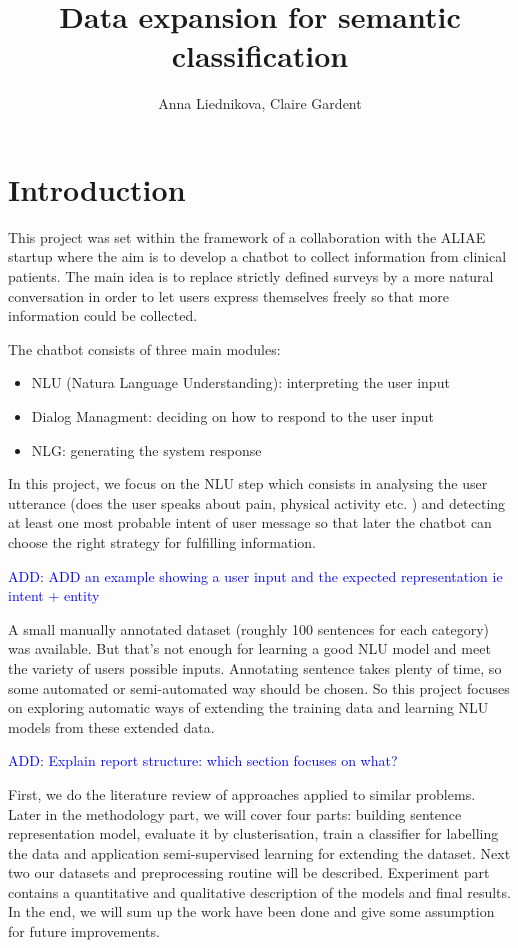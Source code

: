 \documentclass[11pt]{article}
\title{Data expansion for semantic classification}
\author{Anna Liednikova, Claire Gardent}
\newcommand\add[1]{{\textcolor{blue}{ADD: #1}}}
\begin{document}
\maketitle

\tableofcontents

\clearpage

\section{Introduction}

 
This project was set within the framework of a collaboration with the
ALIAE startup where the aim is to develop a chatbot to collect
information from clinical patients. The main idea is to replace
strictly defined surveys by a more natural conversation in order to
let users express themselves freely so that more information could be
collected.

The chatbot consists of three main modules: 
\begin{itemize}
\item NLU (Natura Language Understanding): interpreting the user input
\item Dialog Managment: deciding on how to respond to the user input
\item NLG: generating the system response
\end{itemize}

In this project, we focus on the NLU step which consists in
analysing the user utterance (does the user speaks about pain,
physical activity etc. ) and detecting at least one most probable
intent of user message so that later the chatbot can choose the right
strategy for fulfilling information.

\add{ADD an example showing a user input and the expected representation ie intent + entity}

A small manually annotated dataset (roughly 100 sentences for each category) was available. But that's not enough for learning a good NLU model and meet the variety of users possible inputs. Annotating sentence takes plenty of time, so some automated or semi-automated way should be chosen. So this project focuses on exploring automatic ways of extending the training data and learning NLU models from these extended data.

\add{Explain report structure: which section focuses on what?}

First, we do the literature review of approaches applied to similar problems. Later in the methodology part, we will cover four parts: building sentence representation model, evaluate it by clusterisation, train a classifier for labelling the data and application semi-supervised learning for extending the dataset. Next two our datasets and preprocessing routine will be described. Experiment part contains a quantitative and qualitative description of the models and final results. In the end, we will sum up the work have been done and give some assumption for future improvements.
\end{document}
